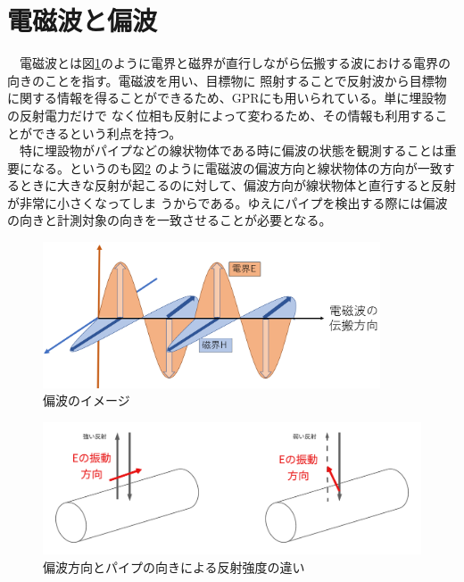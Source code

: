 \documentclass[12pt,a4paper]{jsreport}
\begin{document}
\section{電磁波と偏波}
　電磁波とは図\ref{偏波のイメージ}のように電界と磁界が直行しながら伝搬する波における電界の向きのことを指す。電磁波を用い、目標物に
照射することで反射波から目標物に関する情報を得ることができるため、GPRにも用いられている。単に埋設物の反射電力だけで
なく位相も反射によって変わるため、その情報も利用することができるという利点を持つ。
\\　特に埋設物がパイプなどの線状物体である時に偏波の状態を観測することは重要になる。というのも図\ref{偏波方向とパイプの向きによる反射強度の違い}
のように電磁波の偏波方向と線状物体の方向が一致するときに大きな反射が起こるのに対して、偏波方向が線状物体と直行すると反射が非常に小さくなってしま
うからである。ゆえにパイプを検出する際には偏波の向きと計測対象の向きを一致させることが必要となる。
\begin{figure}[h]
  \begin{center}
   \includegraphics[width=10cm]{./image/wave_propagation.png}
  \caption{偏波のイメージ}\label{偏波のイメージ}
  \end{center}
  \end{figure}

  \begin{figure}[h]
    \begin{center}
     \includegraphics[width=13cm]{./image/polarization.pdf}
    \caption{偏波方向とパイプの向きによる反射強度の違い}\label{偏波方向とパイプの向きによる反射強度の違い}
    \end{center}
    \end{figure}
\end{document}
